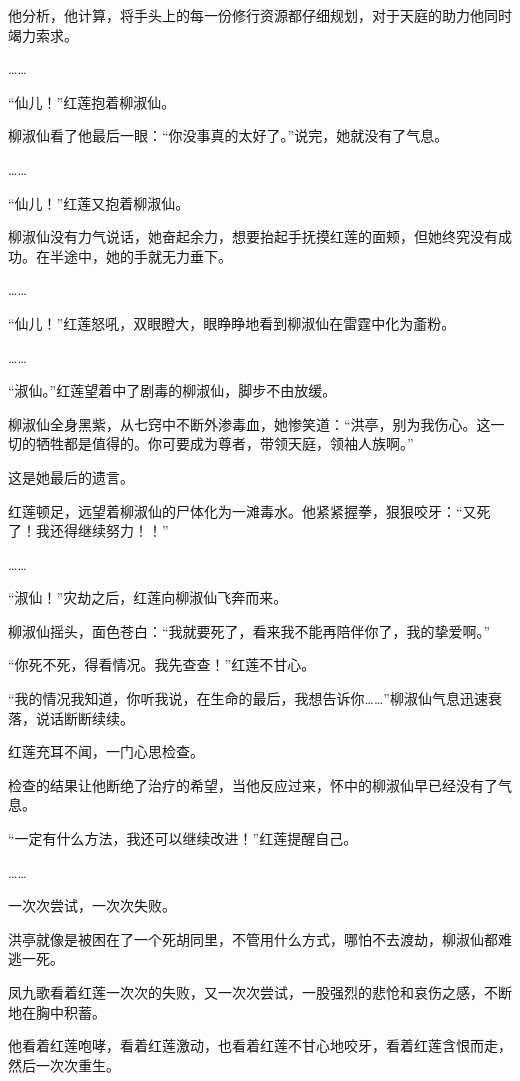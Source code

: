 \begin{this_body}
他分析，他计算，将手头上的每一份修行资源都仔细规划，对于天庭的助力他同时竭力索求。

……

“仙儿！”红莲抱着柳淑仙。

柳淑仙看了他最后一眼：“你没事真的太好了。”说完，她就没有了气息。

……

“仙儿！”红莲又抱着柳淑仙。

柳淑仙没有力气说话，她奋起余力，想要抬起手抚摸红莲的面颊，但她终究没有成功。在半途中，她的手就无力垂下。

……

“仙儿！”红莲怒吼，双眼瞪大，眼睁睁地看到柳淑仙在雷霆中化为齑粉。

……

“淑仙。”红莲望着中了剧毒的柳淑仙，脚步不由放缓。

柳淑仙全身黑紫，从七窍中不断外渗毒血，她惨笑道：“洪亭，别为我伤心。这一切的牺牲都是值得的。你可要成为尊者，带领天庭，领袖人族啊。”

这是她最后的遗言。

红莲顿足，远望着柳淑仙的尸体化为一滩毒水。他紧紧握拳，狠狠咬牙：“又死了！我还得继续努力！！”

……

“淑仙！”灾劫之后，红莲向柳淑仙飞奔而来。

柳淑仙摇头，面色苍白：“我就要死了，看来我不能再陪伴你了，我的挚爱啊。”

“你死不死，得看情况。我先查查！”红莲不甘心。

“我的情况我知道，你听我说，在生命的最后，我想告诉你……”柳淑仙气息迅速衰落，说话断断续续。

红莲充耳不闻，一门心思检查。

检查的结果让他断绝了治疗的希望，当他反应过来，怀中的柳淑仙早已经没有了气息。

“一定有什么方法，我还可以继续改进！”红莲提醒自己。

……

一次次尝试，一次次失败。

洪亭就像是被困在了一个死胡同里，不管用什么方式，哪怕不去渡劫，柳淑仙都难逃一死。

凤九歌看着红莲一次次的失败，又一次次尝试，一股强烈的悲怆和哀伤之感，不断地在胸中积蓄。

他看着红莲咆哮，看着红莲激动，也看着红莲不甘心地咬牙，看着红莲含恨而走，然后一次次重生。


\end{this_body}
